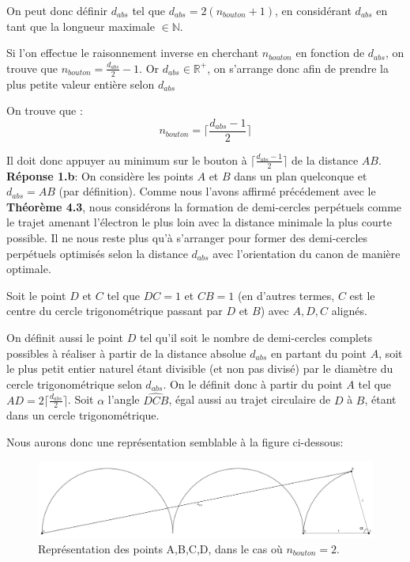 \documentclass{amsart}
\theoremstyle{definition}
\theoremstyle{remark}
\numberwithin{equation}{section}
\begin{document}
On peut donc définir $d_{abs}$ tel que $d_{abs}=2(n_{bouton}+1)$, en considérant $d_{abs}$ en tant que la longueur maximale $\in\mathbb{N}$.

Si l'on effectue le raisonnement inverse en cherchant $n_{bouton}$ en fonction de $d_{abs}$, on trouve que $n_{bouton}=\frac{d_{abs}}{2}-1$. Or $d_{abs}\in\mathbb{R^+}$, on s'arrange donc afin de prendre la plus petite valeur entière selon $d_{abs}$

On trouve que :
\[n_{bouton}=\lceil \frac{d_{abs}-1}{2} \rceil\]

Il doit donc appuyer au minimum sur le bouton à $\lceil \frac{d_{abs}-1}{2} \rceil$ de la distance $AB$.\\

\textbf{Réponse 1.b}: On considère les points $A$ et $B$ dans un plan quelconque et $d_{abs}=AB$ (par définition). Comme nous l'avons affirmé précédement avec le \textbf{Théorème 4.3}, nous considérons la formation de demi-cercles perpétuels comme le trajet amenant l'électron le plus loin avec la distance minimale la plus courte possible. Il ne nous reste plus qu'à s'arranger pour former des demi-cercles perpétuels optimisés selon la distance $d_{abs}$ avec l'orientation du canon de manière optimale.

Soit le point $D$ et $C$ tel que $DC=1$ et $CB=1$ (en d'autres termes, $C$ est le centre du cercle trigonométrique passant par $D$ et $B$) avec $A,D,C$ alignés.

On définit aussi le point $D$ tel qu'il soit le nombre de demi-cercles complets possibles à réaliser à partir de la distance absolue $d_{abs}$ en partant du point $A$, soit le plus petit entier naturel étant divisible (et non pas divisé) par le diamètre du cercle trigonométrique selon $d_{abs}$. On le définit donc à partir du point $A$ tel que $AD=2\lceil\frac{d_{abs}}{2}\rceil$. Soit $\alpha$ l'angle $\widehat{DCB}$, égal aussi au trajet circulaire de $D$ à $B$, étant dans un cercle trigonométrique.

Nous aurons donc une représentation semblable à la figure ci-dessous:

\begin{figure}[H]
  \centering
  \includegraphics[scale=0.2]{images/dmin.png}
  \caption{Représentation des points A,B,C,D, dans le cas où $n_{bouton}=2$.}
\end{figure}
\end{document}
